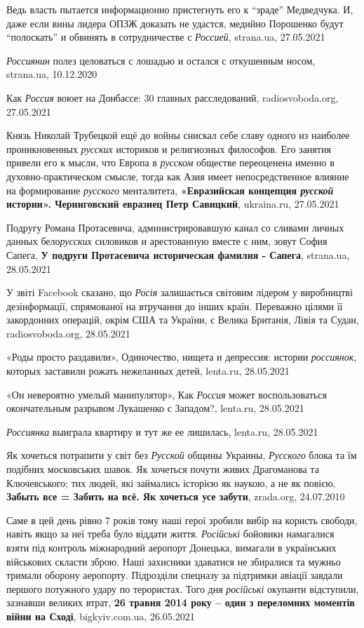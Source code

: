 Ведь власть пытается информационно пристегнуть его к \enquote{зраде} Медведчука. И,
даже если вины лидера ОПЗЖ доказать не удастся, медийно Порошенко будут
\enquote{полоскать} и обвинять в сотрудничестве с \emph{Россией}, strana.ua, 27.05.2021

\emph{Россиянин} полез целоваться с лошадью и остался с откушенным носом, strana.ua, 10.12.2020

Как \emph{Россия} воюет на Донбассе: 30 главных расследований,
radiosvoboda.org, 27.05.2021

Князь Николай Трубецкой ещё до войны снискал себе славу одного из наиболее
проникновенных \emph{русских} историков и религиозных философов. Его занятия
привели его к мысли, что Европа в \emph{русском} обществе переоценена именно в
духовно-практическом смысле, тогда как Азия имеет непосредственное влияние на
формирование \emph{русского} менталитета, \textbf{«Евразийская концепция
\emph{русской} истории». Черниговский евразиец Петр Савицкий}, ukraina.ru,
27.05.2021

Подругу Романа Протасевича, администрировавшую канал со сливами личных данных
бело\emph{русских} силовиков и арестованную вместе с ним, зовут София Сапега,
\textbf{У подруги Протасевича историческая фамилия - Сапега}, strana.ua,
28.05.2021

У звіті Facebook сказано, що \emph{Росія} залишається світовим лідером у
виробництві дезінформації, спрямованої на втручання до інших країн. Переважно
цілями її закордонних операцій, окрім США та України, є Велика Британія, Лівія
та Судан, radiosvoboda.org, 28.05.2021

«Роды просто раздавили», Одиночество, нищета и депрессия: истории
\emph{россиянок}, которых заставили рожать нежеланных детей, lenta.ru,
28.05.2021

«Он невероятно умелый манипулятор», Как \emph{Россия} может воспользоваться
окончательным разрывом Лукашенко с Западом?, lenta.ru, 28.05.2021

\emph{Россиянка} выиграла квартиру и тут же ее лишилась, lenta.ru, 28.05.2021

Як хочеться потрапити у світ без \emph{Русской} общины Украины, \emph{Русского}
блока та їм подібних московських шавок.  Як хочеться почути живих Драгоманова
та Ключевського; тих людей, які займались історією як наукою, а не як повією,
\textbf{Забыть все = Забить на всё. Як хочеться усе забути}, zrada.org,
24.07.2010

Саме в цей день рівно 7 років тому наші герої зробили вибір на користь свободи,
навіть якщо за неї треба було віддати життя. \emph{Російські} бойовики
намагалися взяти під контроль міжнародний аеропорт Донецька, вимагали в
українських військових скласти зброю. Наші захисники здаватися не збиралися та
мужньо тримали оборону аеропорту. Підрозділи спецназу за підтримки авіації
завдали першого потужного удару по терористах. Того дня \emph{російські}
окупанти відступили, зазнавши великих втрат, \textbf{26 травня 2014 року – один
з переломних моментів війни на Сході}, bigkyiv.com.ua, 26.05.2021


